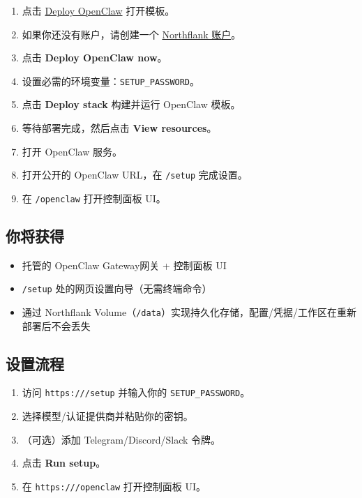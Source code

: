 \begin{enumerate}
  \item 点击 \href{https://northflank.com/stacks/deploy-openclaw}{Deploy OpenClaw} 打开模板。
  \item 如果你还没有账户，请创建一个 \href{https://app.northflank.com/signup}{Northflank 账户}。
  \item 点击 \textbf{Deploy OpenClaw now}。
  \item 设置必需的环境变量：\texttt{SETUP\_PASSWORD}。
  \item 点击 \textbf{Deploy stack} 构建并运行 OpenClaw 模板。
  \item 等待部署完成，然后点击 \textbf{View resources}。
  \item 打开 OpenClaw 服务。
  \item 打开公开的 OpenClaw URL，在 \texttt{/setup} 完成设置。
  \item 在 \texttt{/openclaw} 打开控制面板 UI。
\end{enumerate}


\subsection{你将获得}


\begin{itemize}
  \item 托管的 OpenClaw Gateway网关 + 控制面板 UI
  \item \texttt{/setup} 处的网页设置向导（无需终端命令）
  \item 通过 Northflank Volume（\texttt{/data}）实现持久化存储，配置/凭据/工作区在重新部署后不会丢失
\end{itemize}


\subsection{设置流程}


\begin{enumerate}
  \item 访问 \texttt{https:///setup} 并输入你的 \texttt{SETUP\_PASSWORD}。
  \item 选择模型/认证提供商并粘贴你的密钥。
  \item （可选）添加 Telegram/Discord/Slack 令牌。
  \item 点击 \textbf{Run setup}。
  \item 在 \texttt{https:///openclaw} 打开控制面板 UI。
\end{enumerate}


